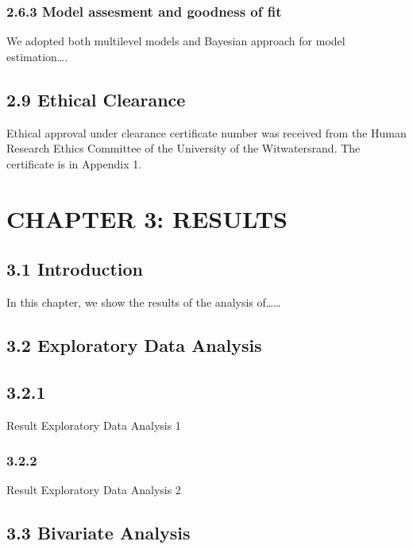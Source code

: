 \documentclass[12pt,]{article}
\begin{document}
\subsubsection{2.6.3 Model assesment and goodness of
fit}\label{model-assesment-and-goodness-of-fit}

We adopted both multilevel models and Bayesian approach for model
estimation\ldots{}.

\subsection{2.9 Ethical Clearance}\label{ethical-clearance}

Ethical approval under clearance certificate number was received from
the Human Research Ethics Committee of the University of the
Witwatersrand. The certificate is in Appendix 1.

\newpage

\addtocounter{section}{2}

\section{CHAPTER 3: RESULTS}\label{chapter-3-results}

\subsection{3.1 Introduction}\label{introduction-1}

In this chapter, we show the results of the analysis of\ldots{}\ldots{}

\subsection{3.2 Exploratory Data
Analysis}\label{exploratory-data-analysis-1}

\subsection{3.2.1}\label{section-7}

Result Exploratory Data Analysis 1

\subsubsection{3.2.2}\label{section-8}

Result Exploratory Data Analysis 2

\subsection{3.3 Bivariate Analysis}\label{bivariate-analysis}
\end{document}

